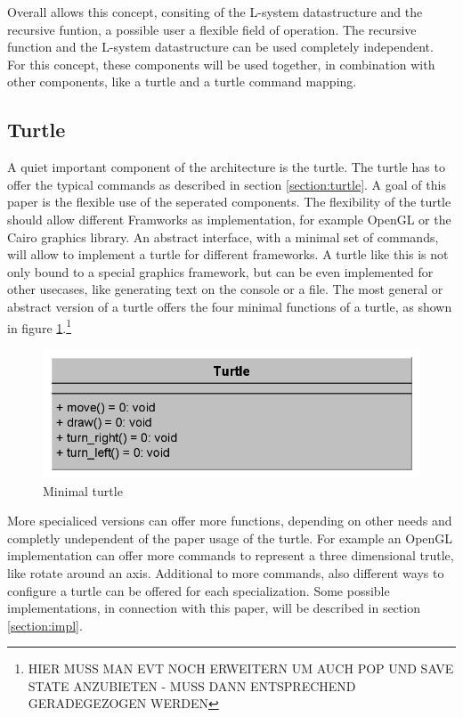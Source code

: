 \documentclass[english]{cpp-hmwk}
\begin{document}
Overall allows this concept, consiting of the L-system datastructure and the recursive funtion, a possible user a flexible field of operation. The recursive function and the L-system datastructure can be used completely independent. For this concept, these components will be used together, in combination with other components, like a turtle and a turtle command mapping.

\subsection{Turtle}
A quiet important component of the architecture is the turtle. The turtle has to offer the typical commands as described in section \ref{section:turtle}. A goal of this paper is the flexible use of the seperated components. The flexibility of the turtle should allow different Framworks as implementation, for example OpenGL or the Cairo graphics library. An abstract interface, with a minimal set of commands, will allow to implement a turtle for different frameworks. A turtle like this is not only bound to a special graphics framework, but can be even implemented for other usecases, like generating text on the console or a file.
The most general or abstract version of a turtle offers the four minimal functions of a turtle, as shown in figure \ref{figure:minimal_turtle}.\footnote{HIER MUSS MAN EVT NOCH ERWEITERN UM AUCH POP UND SAVE STATE ANZUBIETEN - MUSS DANN ENTSPRECHEND GERADEGEZOGEN WERDEN}

\begin{figure}[h!]
	\centering
	\includegraphics[width=0.7\columnwidth]{../graphs/LSystem/examples/class_simple_turtle.png}
	\caption{Minimal turtle}
	\label{figure:minimal_turtle}
\end{figure}

\medskip
\noindent More specialiced versions can offer more functions, depending on other needs and completly undependent of the paper usage of the turtle. For example an OpenGL implementation can offer more commands to represent a three dimensional trutle, like rotate around an axis. Additional to more commands, also different ways to configure a turtle can be offered for each specialization. Some possible implementations, in connection with this paper, will be described in section \ref{section:impl}.
\end{document}
